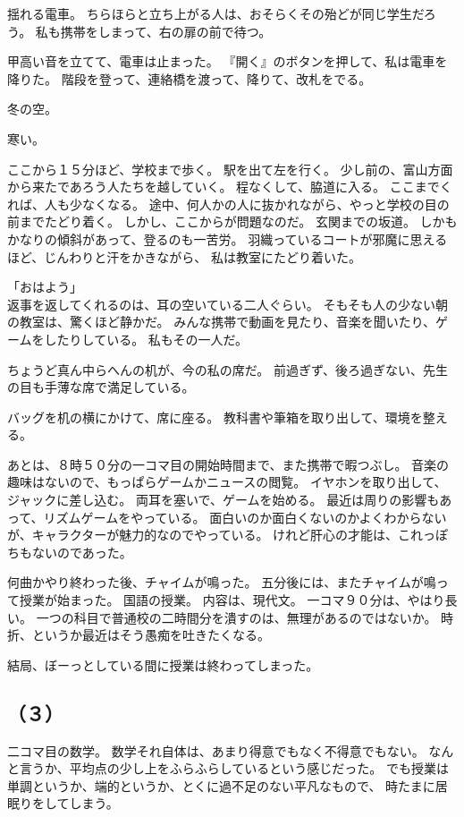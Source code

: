 \documentclass[../IHMain]{subfiles}
\begin{document}
揺れる電車。
ちらほらと立ち上がる人は、おそらくその殆どが同じ学生だろう。
私も携帯をしまって、右の扉の前で待つ。

甲高い音を立てて、電車は止まった。
『開く』のボタンを押して、私は電車を降りた。
階段を登って、連絡橋を渡って、降りて、改札をでる。

冬の空。

寒い。

ここから１５分ほど、学校まで歩く。
駅を出て左を行く。
少し前の、富山方面から来たであろう人たちを越していく。
程なくして、脇道に入る。
ここまでくれば、人も少なくなる。
途中、何人かの人に抜かれながら、やっと学校の目の前までたどり着く。
しかし、ここからが問題なのだ。
玄関までの坂道。
しかもかなりの傾斜があって、登るのも一苦労。
羽織っているコートが邪魔に思えるほど、じんわりと汗をかきながら、
私は教室にたどり着いた。

「おはよう」\\
返事を返してくれるのは、耳の空いている二人ぐらい。
そもそも人の少ない朝の教室は、驚くほど静かだ。
みんな携帯で動画を見たり、音楽を聞いたり、ゲームをしたりしている。
私もその一人だ。

ちょうど真ん中らへんの机が、今の私の席だ。
前過ぎず、後ろ過ぎない、先生の目も手薄な席で満足している。

バッグを机の横にかけて、席に座る。
教科書や筆箱を取り出して、環境を整える。

あとは、８時５０分の一コマ目の開始時間まで、また携帯で暇つぶし。
音楽の趣味はないので、もっぱらゲームかニュースの閲覧。
イヤホンを取り出して、ジャックに差し込む。
両耳を塞いで、ゲームを始める。
最近は周りの影響もあって、リズムゲームをやっている。
面白いのか面白くないのかよくわからないが、キャラクターが魅力的なのでやっている。
けれど肝心の才能は、これっぽちもないのであった。

何曲かやり終わった後、チャイムが鳴った。
五分後には、またチャイムが鳴って授業が始まった。
国語の授業。
内容は、現代文。
一コマ９０分は、やはり長い。
一つの科目で普通校の二時間分を潰すのは、無理があるのではないか。
時折、というか最近はそう愚痴を吐きたくなる。

結局、ぼーっとしている間に授業は終わってしまった。

\subsection*{\gt（３）}

二コマ目の数学。
数学それ自体は、あまり得意でもなく不得意でもない。
なんと言うか、平均点の少し上をふらふらしているという感じだった。
でも授業は単調というか、端的というか、とくに過不足のない平凡なもので、
時たまに居眠りをしてしまう。
\end{document}
